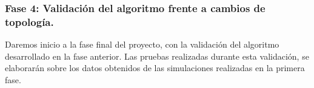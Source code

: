 \subsubsection*{Fase 4: Validación del algoritmo frente a cambios de topología.}
Daremos inicio a la fase final del proyecto, con la validación del algoritmo desarrollado en la fase anterior. Las pruebas realizadas durante esta validación, se elaborarán sobre los datos obtenidos de las simulaciones realizadas en la primera fase.